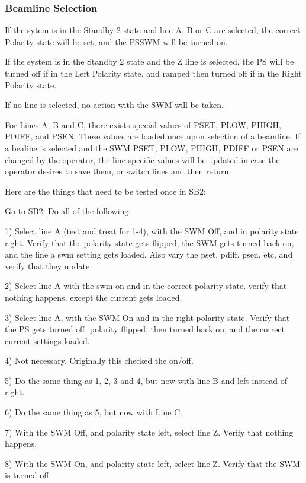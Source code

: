 \documentclass[11pt]{book}		%
\begin{document}
\subsubsection{Beamline Selection} \label{sect:cyc-equip-ctl-beamline-swm-state-controls-polarity}

If the sytem is in the Standby 2 state and line A, B or C are selected, the correct Polarity state will be set, and the PSSWM will be turned on.

If the system is in the Standby 2 state and the Z line is selected, the PS will be turned off if in the Left Polarity state, and ramped then turned off if in the Right Polarity state.

If no line is selected, no action with the SWM will be taken.

For Lines A, B and C, there exists special values of PSET, PLOW, PHIGH, PDIFF, and PSEN. These values are loaded once upon selection of a beamline. If a bealine is selected and the SWM PSET, PLOW, PHIGH, PDIFF or PSEN are changed by the operator, the line specific values will be updated in case the operator desires to save them, or switch lines and then return.

\color{red}

Here are the things that need to be tested once in SB2:

Go to SB2. Do all of the following:

1) Select line A (test and treat for 1-4), with the SWM Off, and in polarity state right. Verify that the polarity state gets flipped, the SWM gets turned back on, and the line a swm setting gets loaded. Also vary the pset, pdiff, psen, etc, and verify that they update.

2) Select line A with the swm on and in the correct polarity state. verify that nothing happens, except the current gets loaded.

3) Select line A, with the SWM On and in the right polarity state. Verify that the PS gets turned off, polarity flipped, then turned back on, and the correct current settings loaded.

4) Not necessary. Originally this checked the on/off.

5) Do the same thing as 1, 2, 3 and 4, but now with line B and left instead of right.

6) Do the same thing as 5, but now with Line C.

7) With the SWM Off, and polarity state left, select line Z. Verify that nothing happens.

8) With the SWM On, and polarity state left, select line Z. Verify that the SWM is turned off.
\end{document}
